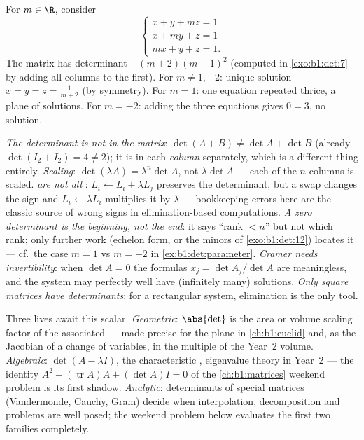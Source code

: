 \begin{example}\label{ex:b1:det:parameter}
For $m \in \R$, consider
\[
\begin{cases}
x + y + mz = 1\\
x + my + z = 1\\
mx + y + z = 1 .
\end{cases}
\]
The matrix has determinant $-(m+2)(m-1)^2$ (computed in
\cref{exo:b1:det:7} by adding all columns to the first). For $m
\neq 1, -2$:
unique solution $x = y = z = \frac{1}{m+2}$ (by symmetry). For $m =
1$: one equation repeated thrice, a plane of solutions. For $m =
-2$: adding the three equations gives $0 = 3$, no solution.
\end{example}

\begin{remark}
\label{rem:b1:det:pitfalls}
\emph{The determinant is not  in the matrix}: $\det(A + B)
\neq \det A + \det B$ (already $\det(I_2 + I_2) = 4 \neq 2$); it
is  in each \emph{column} separately, which is a different
thing entirely.
\emph{Scaling}: $\det(\lambda A) = \lambda^n\det A$, not
$\lambda\det A$ --- each of the $n$ columns is scaled.
\emph{ are not all }: $L_i \leftarrow L_i +
\lambda L_j$ preserves the determinant, but a swap changes the
sign and $L_i \leftarrow \lambda L_i$ multiplies it by $\lambda$
--- bookkeeping errors here are the classic source of wrong
signs in elimination-based computations.
\emph{A zero determinant is the beginning, not the end}: it says
``rank $< n$'' but not which rank; only further work (echelon
form, or the minors of \cref{exo:b1:det:12}) locates it --- cf.\
the case $m = 1$ vs $m = -2$ in \cref{ex:b1:det:parameter}.
\emph{Cramer needs invertibility}: when $\det A = 0$ the
formulas $x_j = \det A_j/\det A$ are meaningless, and the system
may perfectly well have (infinitely many) solutions.
\emph{Only square matrices have determinants}: for a rectangular
system, elimination is the only tool.
\end{remark}

\begin{remark}
\label{rem:b1:det:whereused}
Three lives await this scalar. \emph{Geometric}: $\abs{\det}$ is
the area or volume scaling factor of the associated  --- made
precise for the plane in \cref{ch:b1:euclid} and, as the Jacobian
of a change of variables, in the multiple  of the Year~2
volume. \emph{Algebraic}: $\det(A - \lambda I)$, the
characteristic ,  eigenvalue theory in Year~2 ---
the identity $A^2 - (\operatorname{tr} A)A + (\det A)I = 0$ of
the \cref{ch:b1:matrices} weekend problem is its first shadow.
\emph{Analytic}: determinants of special matrices (Vandermonde,
Cauchy, Gram) decide when interpolation, decomposition and
 problems are well posed; the weekend problem below
evaluates the first two families completely.
\end{remark}

